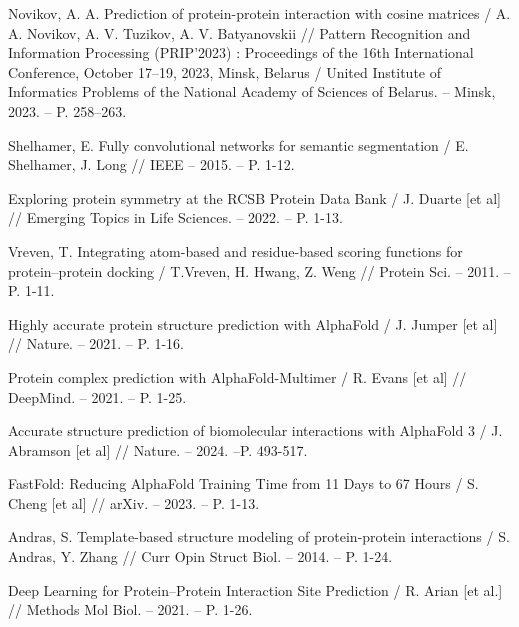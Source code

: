 \newpage
{} %
\renewcommand{\bibsection}{\centering\textbf{\large СПИСОК ИСПОЛЬЗОВАННЫХ ИСТОЧНИКОВ}} %
%

%

\begin{thebibliography}{9}

Novikov, A. A. Prediction of protein-protein interaction with cosine matrices / A. A. Novikov, A. V. Tuzikov, A. V. Batyanovskii // Pattern Recognition and Information Processing (PRIP'2023) : Proceedings of the 16th International Conference, October 17–19, 2023, Minsk, Belarus / United Institute of Informatics Problems of the National Academy of Sciences of Belarus. – Minsk, 2023. – P. 258–263.

Shelhamer, E. Fully convolutional networks for semantic segmentation / E. Shelhamer, J. Long // IEEE – 2015. – P. 1-12.

Exploring protein symmetry at the RCSB Protein Data Bank / J. Duarte [et al] // Emerging Topics in Life Sciences. – 2022. – P. 1-13.

Vreven, T. Integrating atom-based and residue-based scoring functions for protein–protein docking / T.Vreven, H. Hwang, Z. Weng // Protein Sci. – 2011. – P. 1-11.

Highly accurate protein structure prediction with AlphaFold / J. Jumper [et al] // Nature. – 2021. – P. 1-16.

Protein complex prediction with AlphaFold-Multimer / R. Evans [et al] // DeepMind. – 2021. – P. 1-25.

Accurate structure prediction of biomolecular interactions with AlphaFold 3 / J. Abramson [et al] // Nature. -- 2024. --P. 493-517.

FastFold: Reducing AlphaFold Training Time from 11 Days to 67 Hours / S. Cheng [et al] // arXiv. – 2023. – P. 1-13.

Andras, S. Template-based structure modeling of protein-protein interactions / S. Andras, Y. Zhang // Curr Opin Struct Biol. – 2014. – P. 1-24.

Deep Learning for Protein–Protein Interaction Site Prediction / R. Arian [et al.] // Methods Mol Biol. – 2021. – P. 1-26.


\end{thebibliography}
